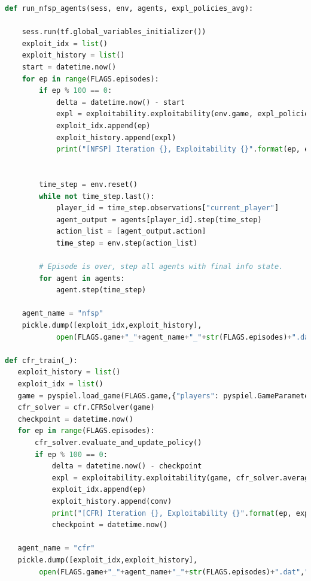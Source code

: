 \documentclass[10pt,a4paper]{article}
\begin{document}
\begin{lstlisting}[language=Python]
def run_nfsp_agents(sess, env, agents, expl_policies_avg):
    
    sess.run(tf.global_variables_initializer())
    exploit_idx = list()
    exploit_history = list()
    start = datetime.now()
    for ep in range(FLAGS.episodes):
        if ep % 100 == 0:
            delta = datetime.now() - start
            expl = exploitability.exploitability(env.game, expl_policies_avg)
            exploit_idx.append(ep)
            exploit_history.append(expl)
            print("[NFSP] Iteration {}, Exploitability {}".format(ep, expl))


        time_step = env.reset()
        while not time_step.last():
            player_id = time_step.observations["current_player"]
            agent_output = agents[player_id].step(time_step)
            action_list = [agent_output.action]
            time_step = env.step(action_list)

        # Episode is over, step all agents with final info state.
        for agent in agents:
            agent.step(time_step)

    agent_name = "nfsp"
    pickle.dump([exploit_idx,exploit_history],
    		open(FLAGS.game+"_"+agent_name+"_"+str(FLAGS.episodes)+".dat","wb"))
    
def cfr_train(_):
   exploit_history = list()
   exploit_idx = list()
   game = pyspiel.load_game(FLAGS.game,{"players": pyspiel.GameParameter(2)})
   cfr_solver = cfr.CFRSolver(game)
   checkpoint = datetime.now()
   for ep in range(FLAGS.episodes):
       cfr_solver.evaluate_and_update_policy()
       if ep % 100 == 0:
           delta = datetime.now() - checkpoint
           expl = exploitability.exploitability(game, cfr_solver.average_policy())
           exploit_idx.append(ep)
           exploit_history.append(conv)
           print("[CFR] Iteration {}, Exploitability {}".format(ep, expl))
           checkpoint = datetime.now()
    
   agent_name = "cfr"
   pickle.dump([exploit_idx,exploit_history],
   		open(FLAGS.game+"_"+agent_name+"_"+str(FLAGS.episodes)+".dat","wb"))
\end{lstlisting}
\newpage
\end{document}
